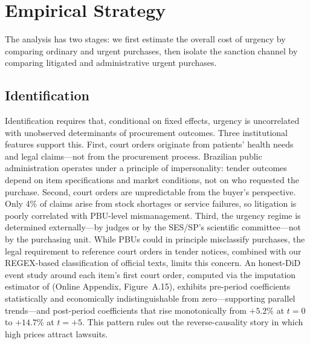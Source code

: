 \section{Empirical Strategy}
\label{sec:empirical}

The analysis has two stages: we first estimate the overall cost of urgency by comparing ordinary and urgent purchases, then isolate the sanction channel by comparing litigated and administrative urgent purchases.

\subsection{Identification}

Identification requires that, conditional on fixed effects, urgency is uncorrelated with unobserved determinants of procurement outcomes. Three institutional features support this. First, court orders originate from patients' health needs and legal claims---not from the procurement process. Brazilian public administration operates under a principle of impersonality: tender outcomes depend on item specifications and market conditions, not on who requested the purchase. Second, court orders are unpredictable from the buyer's perspective. Only 4\% of claims arise from stock shortages or service failures, so litigation is poorly correlated with PBU-level mismanagement. Third, the urgency regime is determined externally---by judges or by the SES/SP's scientific committee---not by the purchasing unit. While PBUs could in principle misclassify purchases, the legal requirement to reference court orders in tender notices, combined with our REGEX-based classification of official texts, limits this concern. An honest-DiD event study around each item's first court order, computed via the imputation estimator of \citet{borusyak2024revisiting} (Online Appendix, Figure~A.15), exhibits pre-period coefficients statistically and economically indistinguishable from zero---supporting parallel trends---and post-period coefficients that rise monotonically from $+5.2\%$ at $t=0$ to $+14.7\%$ at $t=+5$. This pattern rules out the reverse-causality story in which high prices attract lawsuits.

